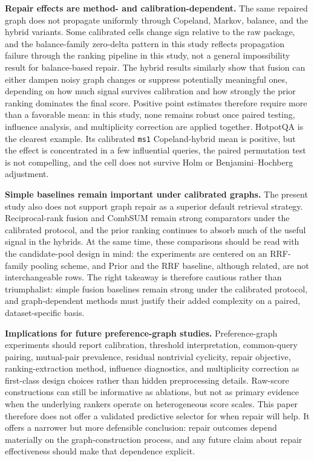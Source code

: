 \documentclass[manuscript,anonymous,review]{acmart}
\begin{document}
\textbf{Repair effects are method- and calibration-dependent.} The same repaired
graph does not propagate uniformly through Copeland, Markov, balance, and the
hybrid variants. Some calibrated cells change sign relative to the raw package,
and the balance-family zero-delta pattern in this study reflects propagation
failure through the ranking pipeline in this study, not a general impossibility
result for balance-based repair. The hybrid results similarly show that fusion can
either dampen noisy graph changes or suppress potentially meaningful ones,
depending on how much signal survives calibration and how strongly the prior
ranking dominates the final score. Positive point estimates therefore require
more than a favorable mean: in this study, none remains robust once paired
testing, influence analysis, and multiplicity correction are applied together.
HotpotQA is the clearest example. Its calibrated \texttt{ms1} Copeland-hybrid
mean is positive, but the effect is concentrated in a few influential queries,
the paired permutation test is not compelling, and the cell does not survive
Holm or Benjamini--Hochberg adjustment.

\textbf{Simple baselines remain important under calibrated graphs.} The present
study also does not support graph repair as a superior default retrieval
strategy. Reciprocal-rank fusion and CombSUM remain strong comparators under the
calibrated protocol, and the prior ranking continues to absorb much of the
useful signal in the hybrids. At the same time, these comparisons should be
read with the candidate-pool design in mind: the experiments are centered on an
RRF-family pooling scheme, and Prior and the RRF baseline, although related, are
not interchangeable rows. The right takeaway is therefore cautious rather than
triumphalist: simple fusion baselines remain strong under the calibrated
protocol, and graph-dependent methods must justify their added complexity on a
paired, dataset-specific basis.

\textbf{Implications for future preference-graph studies.} Preference-graph
experiments should report calibration, threshold interpretation, common-query
pairing, mutual-pair prevalence, residual nontrivial cyclicity, repair
objective, ranking-extraction method, influence diagnostics, and multiplicity
correction as first-class design choices rather than hidden preprocessing
details. Raw-score constructions can still be informative as ablations, but not
as primary evidence when the underlying rankers operate on heterogeneous score
scales. This paper therefore does not offer a validated predictive selector for
when repair will help. It offers a narrower but more defensible conclusion:
repair outcomes depend materially on the graph-construction process, and any
future claim about repair effectiveness should make that dependence explicit.
\end{document}
